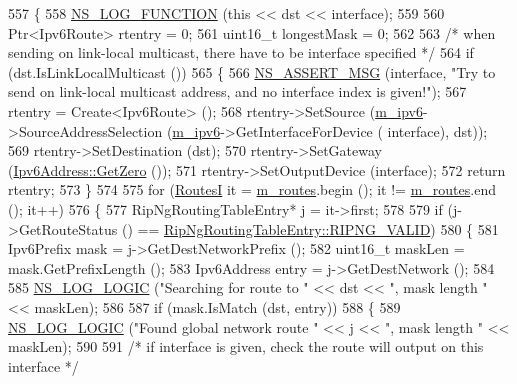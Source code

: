 \begin{DoxyCode}
557 \{
558   \hyperlink{log-macros-disabled_8h_a90b90d5bad1f39cb1b64923ea94c0761}{NS\_LOG\_FUNCTION} (\textcolor{keyword}{this} << dst << interface);
559 
560   Ptr<Ipv6Route> rtentry = 0;
561   uint16\_t longestMask = 0;
562 
563   \textcolor{comment}{/* when sending on link-local multicast, there have to be interface specified */}
564   \textcolor{keywordflow}{if} (dst.IsLinkLocalMulticast ())
565     \{
566       \hyperlink{assert_8h_aff5ece9066c74e681e74999856f08539}{NS\_ASSERT\_MSG} (interface, \textcolor{stringliteral}{"Try to send on link-local multicast address, and no interface
       index is given!"});
567       rtentry = Create<Ipv6Route> ();
568       rtentry->SetSource (\hyperlink{classns3_1_1RipNg_aca7a023799ce2004499a826ba5d5d3fe}{m\_ipv6}->SourceAddressSelection (\hyperlink{classns3_1_1RipNg_aca7a023799ce2004499a826ba5d5d3fe}{m\_ipv6}->GetInterfaceForDevice (
      interface), dst));
569       rtentry->SetDestination (dst);
570       rtentry->SetGateway (\hyperlink{classns3_1_1Ipv6Address_a63a34bdb1505e05fbdd07d316d0bd7e6}{Ipv6Address::GetZero} ());
571       rtentry->SetOutputDevice (interface);
572       \textcolor{keywordflow}{return} rtentry;
573     \}
574 
575   \textcolor{keywordflow}{for} (\hyperlink{classns3_1_1RipNg_aa8bc6103d67089e1e3cd507936f94887}{RoutesI} it = \hyperlink{classns3_1_1RipNg_acfc1011b140f9e612a8c27c9bfb4c6b5}{m\_routes}.begin (); it != \hyperlink{classns3_1_1RipNg_acfc1011b140f9e612a8c27c9bfb4c6b5}{m\_routes}.end (); it++)
576     \{
577       RipNgRoutingTableEntry* j = it->first;
578 
579       \textcolor{keywordflow}{if} (j->GetRouteStatus () == \hyperlink{classns3_1_1RipNgRoutingTableEntry_af723fc23e97afdd05c55da5162b7e673a334e33ca88fb2b8de53c814814d3c017}{RipNgRoutingTableEntry::RIPNG\_VALID})
580         \{
581           Ipv6Prefix mask = j->GetDestNetworkPrefix ();
582           uint16\_t maskLen = mask.GetPrefixLength ();
583           Ipv6Address entry = j->GetDestNetwork ();
584 
585           \hyperlink{group__logging_ga88acd260151caf2db9c0fc84997f45ce}{NS\_LOG\_LOGIC} (\textcolor{stringliteral}{"Searching for route to "} << dst << \textcolor{stringliteral}{", mask length "} << maskLen);
586 
587           \textcolor{keywordflow}{if} (mask.IsMatch (dst, entry))
588             \{
589               \hyperlink{group__logging_ga88acd260151caf2db9c0fc84997f45ce}{NS\_LOG\_LOGIC} (\textcolor{stringliteral}{"Found global network route "} << j << \textcolor{stringliteral}{", mask length "} << maskLen);
590 
591               \textcolor{comment}{/* if interface is given, check the route will output on this interface */}

\end{DoxyCode}
